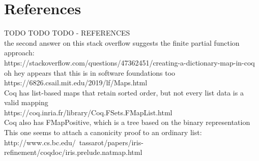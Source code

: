 \documentclass[nonacm]{acmart}
\theoremstyle{slplain}
\numberwithin{thm}{section}
\begin{document}
\section{References}
TODO TODO TODO - REFERENCES
\\
the second answer on this stack overflow suggests the finite partial function approach:
\\
https://stackoverflow.com/questions/47362451/creating-a-dictionary-map-in-coq
\\
oh hey appears that this is in software foundations too
\\
https://6826.csail.mit.edu/2019/lf/Maps.html
\\
Coq has list-based maps that retain sorted order, but not every list data is a valid mapping
\\
https://coq.inria.fr/library/Coq.FSets.FMapList.html
\\
Coq also has FMapPositive, which is a tree based on the binary representation
\\
This one seems to attach a canonicity proof to an ordinary list:
\\
http://www.cs.bc.edu/~tassarot/papers/iris-refinement/coqdoc/iris.prelude.natmap.html

\clearpage
%


% 
\end{document}
